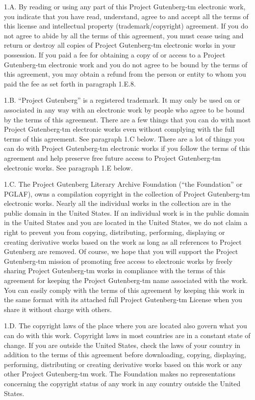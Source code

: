 \documentclass[12pt,oneside]{scrbook}
\begin{document}
  1.A. By reading or using any part of this Project Gutenberg-tm
  electronic work, you indicate that you have read, understand, agree to
  and accept all the terms of this license and intellectual property
  (trademark/copyright) agreement. If you do not agree to abide by all the
  terms of this agreement, you must cease using and return or destroy all
  copies of Project Gutenberg-tm electronic works in your possession. If
  you paid a fee for obtaining a copy of or access to a Project
  Gutenberg-tm electronic work and you do not agree to be bound by the
  terms of this agreement, you may obtain a refund from the person or
  entity to whom you paid the fee as set forth in paragraph 1.E.8.
  
  1.B. ``Project Gutenberg'' is a registered trademark. It may only be
  used on or associated in any way with an electronic work by people who
  agree to be bound by the terms of this agreement. There are a few things
  that you can do with most Project Gutenberg-tm electronic works even
  without complying with the full terms of this agreement. See paragraph
  1.C below. There are a lot of things you can do with Project
  Gutenberg-tm electronic works if you follow the terms of this agreement
  and help preserve free future access to Project Gutenberg-tm electronic
  works. See paragraph 1.E below.
  
  1.C. The Project Gutenberg Literary Archive Foundation (``the
  Foundation'' or PGLAF), owns a compilation copyright in the collection
  of Project Gutenberg-tm electronic works. Nearly all the individual
  works in the collection are in the public domain in the United States.
  If an individual work is in the public domain in the United States and
  you are located in the United States, we do not claim a right to prevent
  you from copying, distributing, performing, displaying or creating
  derivative works based on the work as long as all references to Project
  Gutenberg are removed. Of course, we hope that you will support the
  Project Gutenberg-tm mission of promoting free access to electronic
  works by freely sharing Project Gutenberg-tm works in compliance with
  the terms of this agreement for keeping the Project Gutenberg-tm name
  associated with the work. You can easily comply with the terms of this
  agreement by keeping this work in the same format with its attached full
  Project Gutenberg-tm License when you share it without charge with
  others.
  
  1.D. The copyright laws of the place where you are located also govern
  what you can do with this work. Copyright laws in most countries are in
  a constant state of change. If you are outside the United States, check
  the laws of your country in addition to the terms of this agreement
  before downloading, copying, displaying, performing, distributing or
  creating derivative works based on this work or any other Project
  Gutenberg-tm work. The Foundation makes no representations concerning
  the copyright status of any work in any country outside the United
  States.
  
\end{document}
